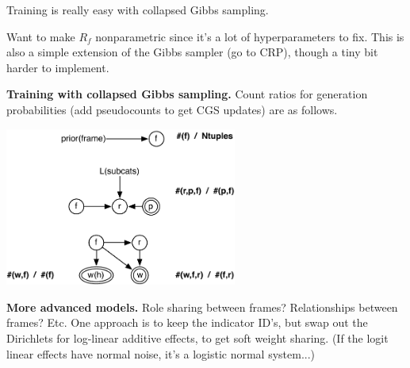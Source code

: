 \documentclass[11pt,letterpaper]{article}
\begin{document}
Training is really easy with collapsed Gibbs sampling.

Want to make $R_f$ nonparametric since it's a lot of hyperparameters to fix.
This is also a simple extension of the Gibbs sampler (go to CRP), though a tiny bit
harder to implement.

\textbf{Training with collapsed Gibbs sampling.}
Count ratios for generation probabilities (add pseudocounts to get CGS updates) are as follows.

\includegraphics[width=3in]{cgs_ratios.pdf}


\textbf{More advanced models.}  Role sharing between frames?  Relationships between frames?  Etc.  One approach is to keep the indicator ID's, but swap out the Dirichlets for log-linear additive effects, to get soft weight sharing.  (If the logit linear effects have normal noise, it's a logistic normal system...)

% 
% 
\end{document}
